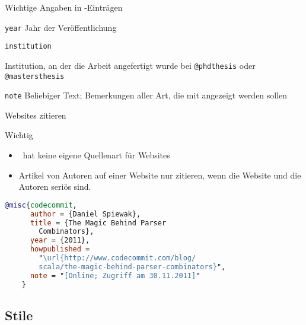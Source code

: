 \begin{Frame}{Wichtige Angaben in \BibTeX-Einträgen}
  \begin{Block}{\lstinline-year-}
    Jahr der Veröffentlichung
  \end{Block}

  \begin{Block}{\lstinline-institution-}
    \raggedright
    Institution, an der die Arbeit angefertigt wurde
    bei \lstinline-@phdthesis- oder \lstinline-@mastersthesis-
  \end{Block}

  \begin{Block}{\lstinline-note-}
    Beliebiger Text; Bemerkungen aller Art,
    die mit angezeigt werden sollen
  \end{Block}
\end{Frame}

\begin{Frame}[fragile]{Websites zitieren}
  \begin{alertblock}{Wichtig}
    \begin{itemize}
      \item \BibTeX\ hat \alert{keine eigene Quellenart} für Websites
      \item \alert{Artikel von Autoren} auf einer Website nur zitieren,
        wenn die Website und die \alert{Autoren seriös} sind.
    \end{itemize}
  \end{alertblock}

  \xxx

  \begin{lstlisting}[language=BibTeX,gobble=4,moretexcs={url}]
    @misc{codecommit,
      author = {Daniel Spiewak},
      title = {The Magic Behind Parser
        Combinators},
      year = {2011},
      howpublished =
        "\url{http://www.codecommit.com/blog/
        scala/the-magic-behind-parser-combinators}",
      note = "[Online; Zugriff am 30.11.2011]"
    }
  \end{lstlisting}
\end{Frame}

\subsection{Stile}

